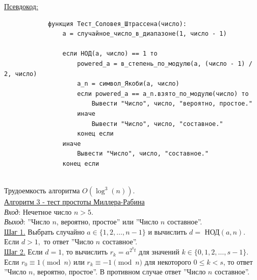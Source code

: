 \documentclass[bachelor, och, labwork]{shiza}
\begin{document}
        \underline{Псевдокод:}
            \begin{verbatim}
            функция Тест_Соловея_Штрассена(число):
                a = случайное_число_в_диапазоне(1, число - 1)
            
                если НОД(a, число) == 1 то
                    powered_a = в_степень_по_модулю(a, (число - 1) / 2, число)
                    a_n = символ_Якоби(a, число)
                    если powered_a == a_n.взято_по_модулю(число) то
                        Вывести "Число", число, "вероятно, простое."
                    иначе
                        Вывести "Число", число, "составное."
                    конец если
                иначе
                    Вывести "Число", число, "составное."
                конец если
                         
            \end{verbatim}

            Трудоемкость алгоритма $O(\log^3(n))$.\\


        \underline{Алгоритм 3 - тест простоты Миллера-Рабина}\\
            \textit{Вход}: Нечетное число $n > 5$.\\
            \textit{Выход}: ''Число $n$, вероятно, простое'' или ''Число $n$ составное''.\\
            \underline{Шаг 1.} Выбрать случайно $a \in \{1, 2, \dots, n - 1\}$ и
            вычислить $d = $ НОД$(a, n).$ Если $d > 1,$ то ответ ''Число $n$ составное''.\\
            \underline{Шаг 2.} Если $d = 1$, то вычислить $r_k = a^{2^k t}$ для
            значений $k \in \{0, 1, 2, \dots, s - 1\}$. Если $r_0 \equiv 1 \pmod
            n$ или $r_k \equiv -1 \pmod n$ для некоторого $0 \leq k < s$, то
            ответ ''Число $n$, вероятно, простое''. В противном случае ответ
            ''Число $n$ составное''.\\
\end{document}
